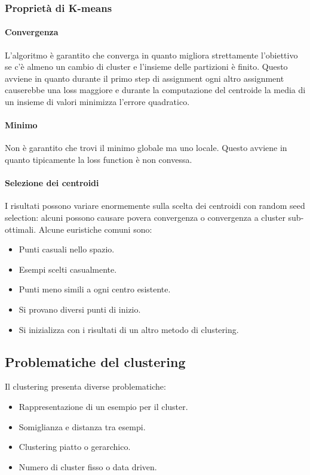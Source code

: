 		\subsubsection{Propriet\`a di K-means}
		
		\paragraph{Convergenza}
		L'algoritmo \`e garantito che converga in quanto migliora strettamente l'obiettivo se c'\`e almeno un cambio di cluster e l'insieme delle partizioni \`e finito.
		Questo avviene in quanto durante il primo step di assignment ogni altro assignment causerebbe una loss maggiore e durante la computazione del centroide la media di un insieme di valori minimizza l'errore quadratico.
		
		\paragraph{Minimo}
		Non \`e garantito che trovi il minimo globale ma uno locale.
		Questo avviene in quanto tipicamente la loss function \`e non convessa.
		
		\paragraph{Selezione dei centroidi}
		I risultati possono variare enormemente sulla scelta dei centroidi con random seed selection: alcuni possono causare povera convergenza o convergenza a cluster sub-ottimali.
		Alcune euristiche comuni sono:
		\begin{multicols}{2}
			\begin{itemize}
				\item Punti casuali nello spazio.
				\item Esempi scelti casualmente.
				\item Punti meno simili a ogni centro esistente.
				\item Si provano diversi punti di inizio.
				\item Si inizializza con i risultati di un altro metodo di clustering.
			\end{itemize}
		\end{multicols}

	\subsection{Problematiche del clustering}
	Il clustering presenta diverse problematiche:
	\begin{multicols}{2}
		\begin{itemize}
			\item Rappresentazione di un esempio per il cluster.
			\item Somiglianza e distanza tra esempi.
			\item Clustering piatto o gerarchico.
			\item Numero di cluster fisso o data driven.
		\end{itemize}
	\end{multicols}
	
